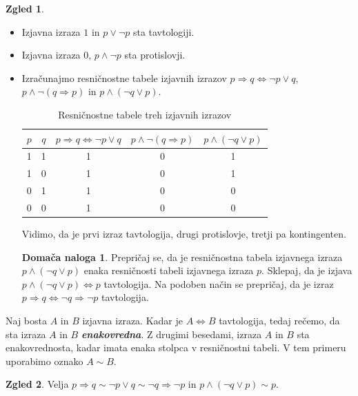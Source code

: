 \documentclass[11pt]{book}
\def\definicija{\color{rdeca}\bf\em}
\theoremstyle{definition}
\theoremstyle{zgled}
\newtheorem*{zgled}{Zgled}
\theoremstyle{odprtproblem}
\theoremstyle{domacanaloga}
\newtheorem*{domacanaloga}{Domača naloga}
\theoremstyle{izrek}
\begin{document}
\begin{zgled} \leavevmode
\begin{itemize}
    \item Izjavna izraza $1$ in $p \lor \lnot p$ sta tavtologiji.
    \item Izjavna izraza $0$, $p \land \lnot p$ sta protislovji.
    \item Izračunajmo resničnostne tabele izjavnih izrazov $p \Rightarrow q \Leftrightarrow \lnot p \lor q$, $p \land \lnot (q \Rightarrow p)$ in $p \land (\lnot q \lor p)$. 
    
    \begin{table}[h]
        \centering
        \begin{tabular}{cc|ccc}
            $p$ & $q$ & $p \Rightarrow q \Leftrightarrow \lnot p \lor q$ & $p \land \lnot (q \Rightarrow p)$ & $p \land (\lnot q \lor p)$ \\ \hline
            1 & 1 & 1 & 0 & 1 \\
            1 & 0 & 1 & 0 & 1 \\
            0 & 1 & 1 & 0 & 0 \\
            0 & 0 & 1 & 0 & 0 \\
        \end{tabular}
        \caption{Resničnostne tabele treh izjavnih izrazov}
    \end{table}

    Vidimo, da je prvi izraz tavtologija, drugi protislovje, tretji pa kontingenten.

    \begin{domacanaloga}
        Prepričaj se, da je resničnostna tabela izjavnega izraza $p \land (\lnot q \lor p)$ enaka resničnosti tabeli izjavnega izraza $p$. Sklepaj, da je izjava $p \land (\lnot q \lor p) \Leftrightarrow p$ tavtologija. Na podoben način se prepričaj, da je izraz $p \Rightarrow q \Leftrightarrow \lnot q \Rightarrow \lnot p$ tavtologija.
    \end{domacanaloga}        
\end{itemize}
\end{zgled}

Naj bosta $A$ in $B$ izjavna izraza. Kadar je $A \Leftrightarrow B$ tavtologija, tedaj rečemo, da sta izraza $A$ in $B$ {\definicija enakovredna}. Z drugimi besedami, izraza $A$ in $B$ sta enakovrednosta, kadar imata enaka stolpca v resničnostni tabeli. V tem primeru uporabimo oznako $A \sim B$.

\begin{zgled}
Velja $p \Rightarrow q \sim \lnot p \lor q \sim \lnot q \Rightarrow \lnot p$ in $p \land (\lnot q \lor p) \sim p$.
\end{zgled}
\end{document}
